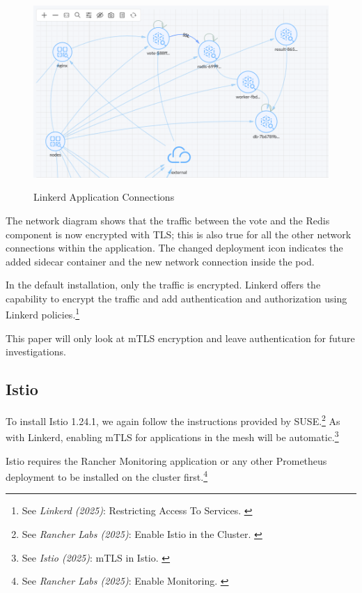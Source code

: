 \begin{figure}[H]
\centering
\caption {Linkerd Application Connections}
\includegraphics[width=\linewidth]{images/linkerd-map.png}
\label{fig:linkerdMap}
\end{figure}

The network diagram shows that the traffic between the vote and the Redis component is now encrypted with TLS; this is also true for all the other network connections within the application. The changed deployment icon indicates the added sidecar container and the new network connection inside the pod.

In the default installation, only the traffic is encrypted. Linkerd offers the capability to encrypt the traffic and add authentication and authorization using Linkerd policies.\footnote{See \textit{Linkerd (2025)}: Restricting Access To Services. \cite{restrictingAccess}}

This paper will only look at mTLS encryption and leave authentication for future investigations.

\subsection{Istio}

To install Istio 1.24.1, we again follow the instructions provided by SUSE.\footnote{See \textit{Rancher Labs (2025)}: Enable Istio in the Cluster. \cite{enableIstio}} As with Linkerd, enabling mTLS for applications in the mesh will be automatic.\footnote{See \textit{Istio (2025)}: mTLS in Istio. \cite{istioMtls}} 

Istio requires the Rancher Monitoring application or any other Prometheus deployment to be installed on the cluster first.\footnote{See \textit{Rancher Labs (2025)}: Enable Monitoring. \cite{enableMonitoring}}

